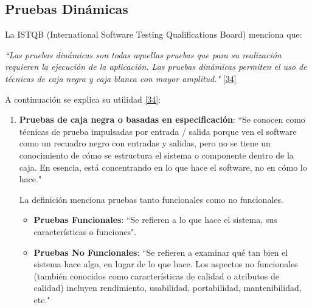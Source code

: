 \subsection{Pruebas Dinámicas}

La ISTQB (International Software Testing Qualifications Board) menciona que:

\textit {``Las pruebas dinámicas son todas aquellas pruebas que para su realización requieren la ejecución de la aplicación. Las pruebas dinámicas permiten el uso de técnicas de caja negra y caja blanca con mayor amplitud."} \hyperlink{b34}{[34]} 

A continuación se explica su utilidad \hyperlink{b34}{[34]}:  

\begin{enumerate}
	\item \textbf {Pruebas de caja negra o basadas en especificación}: ``Se conocen como técnicas de prueba impulsadas por entrada / salida porque ven el software como un recuadro negro con entradas y salidas, pero no se tiene un conocimiento de cómo se estructura el sistema o componente dentro de la caja. En esencia, está concentrando en lo que hace el software, no en cómo lo hace."
	
		La definición menciona pruebas tanto funcionales como no funcionales.
		\begin{itemize}
			\item \textbf {Pruebas Funcionales}: ``Se refieren a lo que hace el sistema, sus características o funciones".
			\item \textbf {Pruebas No Funcionales}: ``Se refieren a examinar qué tan bien el sistema hace algo, en lugar de lo que hace. Los aspectos no funcionales (también conocidos como características de calidad o atributos de calidad) incluyen rendimiento, usabilidad, portabilidad, mantenibilidad, etc."
		\end{itemize}
	

\end{enumerate}
